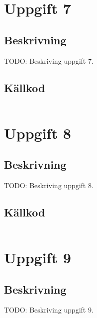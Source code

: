 \documentclass[11pt,a4paper]{article}
\begin{document}
\section{Uppgift 7}\label{uppgift-7}

\subsection{Beskrivning}
TODO: Beskriving uppgift 7.

\subsection{Källkod}\label{uppgift-7_src}
\inputminted[]{java}{../src/Lab1Uppg07.java}

\section{Uppgift 8}\label{uppgift-8}

\subsection{Beskrivning}
TODO: Beskriving uppgift 8.

\subsection{Källkod}\label{uppgift-8_src}
\inputminted[]{java}{../src/Lab1Uppg08.java}

\section{Uppgift 9}\label{uppgift-9}

\subsection{Beskrivning}
TODO: Beskriving uppgift 9.
\end{document}
